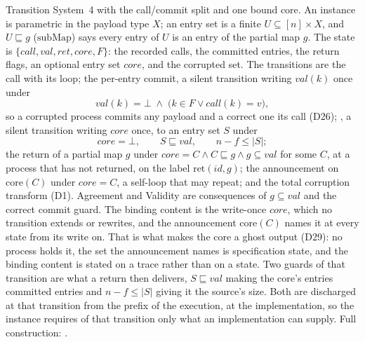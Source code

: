 \begin{definition}
  \label{def:aba-gather-spec}
  \leanok
  Transition System~4 with the call/commit split and one bound core.
  An instance is parametric in the payload type $X$; an entry set is a finite $U \subseteq [n] \times X$, and $U \sqsubseteq g$ ($\mathrm{subMap}$) says every entry of $U$ is an entry of the partial map $g$.
  The state is $\{call, val, ret, core, F\}$: the recorded calls, the committed entries, the return flags, an optional entry set $core$, and the corrupted set.
  The transitions are the call with its loop; the per-entry commit, a silent transition writing $val(k)$ once under
  \[
    val(k) = \bot \;\wedge\; \bigl(k \in F \vee call(k) = v\bigr),
  \]
  so a corrupted process commits any payload and a correct one its call (D26); , a silent transition writing $core$ once, to an entry set $S$ under
  \[
    core = \bot,\qquad S \sqsubseteq val,\qquad n - f \le |S|;
  \]
  the return of a partial map $g$ under $core = C \wedge C \sqsubseteq g \wedge g \subseteq val$ for some $C$, at a process that has not returned, on the label $\mathrm{ret}(id, g)$; the announcement  on $\mathrm{core}(C)$ under $core = C$, a self-loop that may repeat; and the total corruption transform (D1).
  Agreement and Validity are consequences of $g \subseteq val$ and the correct commit guard.
  The binding content is the write-once $core$, which no transition extends or rewrites, and the announcement $\mathrm{core}(C)$ names it at every state from its write on.
  That is what makes the core a ghost output (D29): no process holds it, the set the announcement names is specification state, and the binding content is stated on a trace rather than on a state.
  Two guards of that transition are what a return then delivers, $S \sqsubseteq val$ making the core's entries committed entries and $n - f \le |S|$ giving it the source's size.
  Both are discharged at that transition from the prefix of the execution, at the implementation, so the instance requires of that transition only what an implementation can supply.
  Full construction: .
\end{definition}
